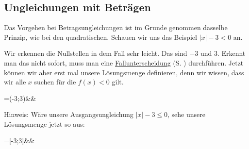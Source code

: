 \documentclass[12pt]{article}
\newcommand{\highlight}[2]{\textcolor{blue}{\hyperref[#1]{#2}} (S. \pageref{#1})}
\begin{document}
	\subsection{Ungleichungen mit Beträgen}
		Das Vorgehen bei Betragsungleichungen ist im Grunde genommen dasselbe Prinzip, wie bei den quadratischen. Schauen wir uns das Beispiel $\vert x \vert -3 < 0$ an. 
		\begin{center}
		\end{center}
		Wir erkennen die Nullstellen in dem Fall sehr leicht. Das sind $-3$ und $3$. Erkennt man das nicht sofort, muss man eine \highlight{sec:betragsgleichungen}{Fallunterscheidung} durchführen. Jetzt können wir aber erst mal unsere Lösungsmenge definieren, denn wir wissen, dass wir alle $x$ suchen für die $f(x)<0$ gilt.
		\begin{flalign*}
		=(-3;3)&&
		\end{flalign*}
		Hinweis: Wäre unsere Ausgangsungleichung $\vert x \vert -3 \le 0$, sehe unsere Lösungsmenge jetzt so aus:
		\begin{flalign*}
		=[-3;3]&&
		\end{flalign*}
\end{document}
